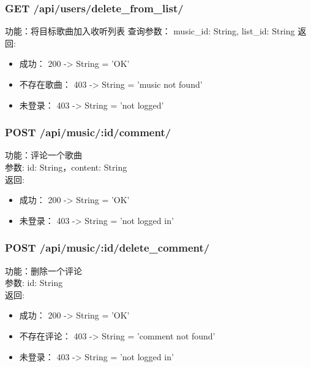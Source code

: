 \subsubsection{GET /api/users/delete\_from\_list/}

\noindent
功能：将目标歌曲加入收听列表
查询参数： music\_id: String, list\_id: String
返回:
\begin{itemize}
	\item 成功： 200 -> String = 'OK'
	\item 不存在歌曲： 403 -> String = 'music not found'
	\item 未登录： 403 -> String = 'not logged'
\end{itemize}

	\subsubsection{POST /api/music/:id/comment/}
	\noindent
	功能：评论一个歌曲\\
	参数: id: String，content: String\\
	返回:
	\begin{itemize}
	\item 成功： 200 -> String = 'OK'
	\item 未登录： 403 -> String = 'not logged in'
	\end{itemize}



	\subsubsection{POST /api/music/:id/delete\_comment/}
	\noindent
	功能：删除一个评论\\
	参数: id: String\\
	返回:
	\begin{itemize}
	\item 成功： 200 -> String = 'OK'
	\item 不存在评论： 403 -> String = 'comment not found'
	\item 未登录： 403 -> String = 'not logged in'
	\end{itemize}

\iffalse
{}

